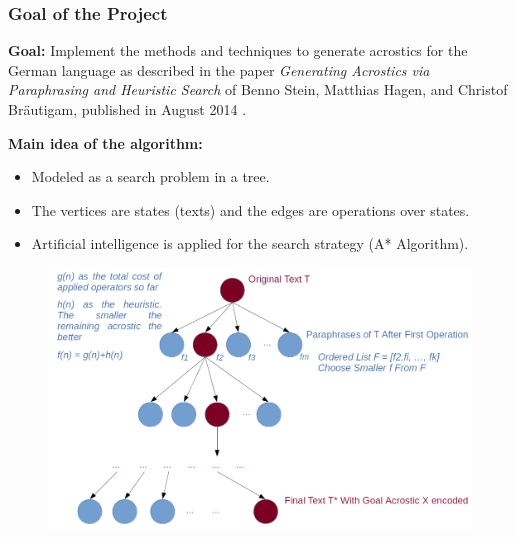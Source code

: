 \documentclass{beamer}
\begin{document}
\begin{frame}
\frametitle{Goal of the Project}
\textbf{Goal:} Implement the methods and techniques to generate acrostics for the German language as described in the paper \emph{Generating Acrostics via Paraphrasing and Heuristic Search} of Benno Stein, Matthias Hagen, and Christof Bräutigam, published in August 2014 \cite{Stein}. \par

\textbf{Main idea of the algorithm:}
	\begin{itemize}
	\item Modeled as a search problem in a tree.
	\item The vertices are states (texts) and the edges are operations over states.
	\item Artificial intelligence is applied for the search strategy (A* Algorithm).
	\end{itemize}
	
\end{frame}

\begin{frame}
\begin{figure}[H]
\vspace*{-15pt}
\hspace*{-25pt}
\includegraphics[scale=0.44]{a_star.png}
\end{figure}
\end{frame}
\end{document}
